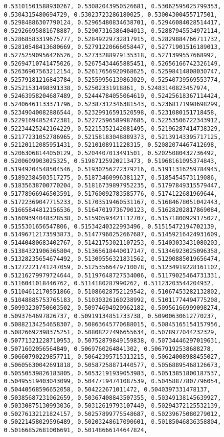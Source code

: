 \documentclass[11pt]{article}
\begin{document}
\begin{Verbatim}[commandchars=\\\{\}]
0.53101501588930267, 0.53082043950526681, 0.53062595025799353, 0.5304315480694729, 0.53023723286180025, 0.53004300455717501, 0.52984886307790124, 0.52965480834638701, 0.52946084028514417, 0.52926695881678887, 0.52907316386404013, 0.52887945534972114, 0.52868583319675777, 0.52849229732817915, 0.52829884766711732, 0.52810548413680669, 0.52791220666058447, 0.52771901516189013, 0.52752590956426526, 0.52733288979135318, 0.5271399557668992, 0.52694710741475026, 0.52675434465885451, 0.52656166742326149, 0.52636907563212154, 0.52617656920968625, 0.52598414808030747, 0.52579181216843784, 0.52559956139863029, 0.52540739569553774, 0.52521531498391338, 0.52502331918861, 0.52483140823457974, 0.52463958204687489, 0.52444784055064619, 0.52425618367114424, 0.52406461133371796, 0.52387312346381543, 0.52368171998698299, 0.52349040082886544, 0.52329916591520598, 0.5231080151718458, 0.52291694852472381, 0.52272596589987685, 0.52253506722343912, 0.52234425242164229, 0.52215352142081495, 0.52196287414738329, 0.52177231052786965, 0.52158183048889373, 0.52139143395717125, 0.52120112085951431, 0.5210108911228315, 0.52082074467412698, 0.52063068144050129, 0.5204407013491501, 0.52025080432736492, 0.5200609903025325, 0.51987125920213473, 0.51968161095374843, 0.51949204548504546, 0.51930256272379216, 0.51911316259784945, 0.51892384503517275, 0.51873460996381127, 0.5185454573119086, 0.51835638700770204, 0.51816739897952235, 0.51797849315579447, 0.51778966946503591, 0.51760092783585776, 0.5174122681969644, 0.51722369047715233, 0.51703519460531167, 0.51684678051042443, 0.51665844812156536, 0.51647019736790123, 0.51628202817869084, 0.51609394048328538, 0.51590593421112707, 0.51571800929175027, 0.5155301656547806, 0.51534240322993496, 0.51515472194702139, 0.51496712173593873, 0.51477960252667687, 0.51459216424931609, 0.51440480683402767, 0.51421753021107253, 0.51403033431080203, 0.51384321906365804, 0.51365618440017147, 0.51346923025096358, 0.51328235654674492, 0.51309556321831562, 0.51290885019656474, 0.51272221741247059, 0.51253566479710078, 0.51234919228161102, 0.51216279979724644, 0.51197648727534006, 0.51179025464731331, 0.5116041018446762, 0.5114180287990262, 0.51123203544204932, 0.51104612170551866, 0.51086028752129542, 0.51067453282132802, 0.51048885753765183, 0.51030326160238992, 0.51011774494775208, 0.50993230750603502, 0.50974694920962182, 0.50956166999098274, 0.5093764697826737, 0.50919134851733738, 0.50900630612770237, 0.50882134254658307, 0.50863645770688015, 0.50845165154157956, 0.50826692398375251, 0.50808227496655634, 0.5078977044232329, 0.50771321228710953, 0.50752879849159838, 0.50734446297019631, 0.5071602056564849, 0.5069760264841302, 0.50679192538688278, 0.50660790229857711, 0.50642395715313215, 0.50624008988455027, 0.50605630042691818, 0.50587258871440577, 0.50568895468126673, 0.50550539826183805, 0.50532191939053983, 0.50513851800187537, 0.50495519403043099, 0.50477194741087539, 0.50458877807796054, 0.50440568596652058, 0.504222671011472, 0.5040397331478137, 0.50385687231062659, 0.50367408843507355, 0.50349138145639927, 0.50330875130993036, 0.50312619793107449, 0.50294372125532139, 0.50276132121824157, 0.50257899775548687, 0.50239675080279012, 0.50221458029596489, 0.50203248617090601, 0.50185046836358804, 0.50166852681006691, 0.50148666144647824, 
\end{Verbatim}
\end{document}
